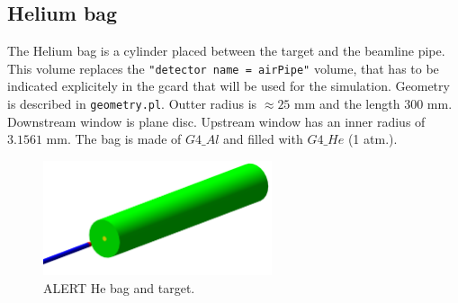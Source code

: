 {	\subsection{Helium bag}
	The Helium bag is a cylinder placed between the target and the beamline pipe. This volume replaces the \texttt{"detector name = airPipe"} volume, that has to be indicated explicitely in the gcard that will be used for the simulation. Geometry is described in \texttt{geometry.pl}. Outter radius is $\approx 25$ mm  and the length $300$ mm. Downstream window is plane disc. Upstream window has an inner radius of $3.1561$ mm. The bag is made of $G4\_Al$ and filled with $G4\_He$ (1 atm.).		
	\begin{figure}[H]
	\centering
	\includegraphics[width=0.6\textwidth]{gemc_ALERT_TG_andHebag_zoom.png}
	\caption{ALERT He bag and target.}
	\label{fig:hebag_gemc}
	\end{figure}	
	
}
